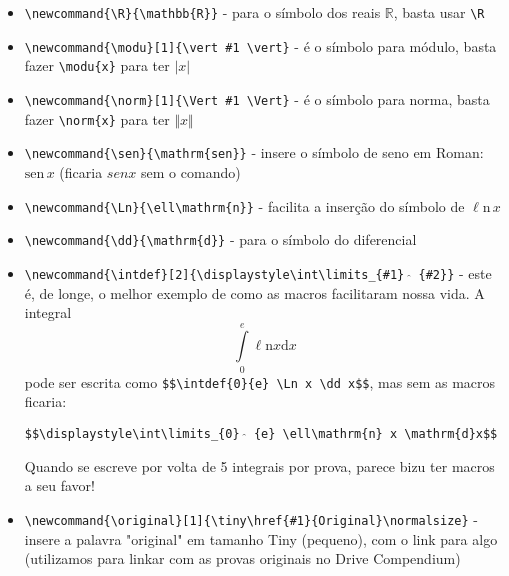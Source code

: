 \documentclass[12pt,a4paper]{article}
\newcommand{\modu}[1]{\vert #1 \vert}
\newcommand{\norm}[1]{\Vert #1 \Vert}
\newcommand{\sen}{\mathrm{sen}}
\newcommand{\dd}{\mathrm{d}}
\newcommand{\Ln}{\ell\mathrm{n}}
\newcommand{\intdef}[2]{\displaystyle\int\limits_{#1}^{#2}}
\begin{document}
\begin{itemize}
\item \texttt{\textbackslash newcommand\{\textbackslash R\}\{\textbackslash mathbb\{R\}\}} - para o símbolo dos reais $\mathbb{R}$, basta usar \texttt{\textbackslash R}

\item \texttt{\textbackslash newcommand\{\textbackslash modu\}[1]\{\textbackslash vert \#1 \textbackslash vert\}} - é o símbolo para módulo, basta fazer \texttt{\textbackslash modu\{x\}} para ter $\modu{x}$

\item \texttt{\textbackslash newcommand\{\textbackslash norm\}[1]\{\textbackslash Vert \#1 \textbackslash Vert\}} - é o símbolo para norma, basta fazer \texttt{\textbackslash norm\{x\}} para ter $\norm{x}$

\item \texttt{\textbackslash newcommand\{\textbackslash sen\}\{\textbackslash mathrm\{sen\}\}} - insere o símbolo de seno em Roman: $\sen\, x$ (ficaria $senx$ sem o comando)

\item \texttt{\textbackslash newcommand\{\textbackslash Ln\}\{\textbackslash ell\textbackslash mathrm\{n\}\}} - facilita a inserção do símbolo de $\Ln\, x$

\item \texttt{\textbackslash newcommand\{\textbackslash dd\}\{\textbackslash mathrm\{d\}\}} - para o símbolo do diferencial

\item \texttt{\textbackslash newcommand\{\textbackslash intdef\}[2]\{\textbackslash displaystyle\textbackslash int\textbackslash limits\_\{\#1\} $\widehat{}$ \{\#2\}\}} - este é, de longe, o melhor exemplo de como as macros facilitaram nossa vida. A integral $$\intdef{0}{e} \Ln x \dd x$$ pode ser escrita como \texttt{\$\$\textbackslash intdef\{0\}\{e\} \textbackslash Ln x \textbackslash dd x\$\$}, mas sem as macros ficaria:

\texttt{\$\$\textbackslash displaystyle\textbackslash int\textbackslash limits\_\{0\} $\widehat{}$ \{e\} \textbackslash ell\textbackslash mathrm\{n\} x \textbackslash mathrm\{d\}x\$\$}

Quando se escreve por volta de 5 integrais por prova, parece bizu ter macros a seu favor!


\item \texttt{\textbackslash newcommand\{\textbackslash original\}[1]\{\textbackslash tiny\textbackslash href\{\#1\}\{Original\}\textbackslash normalsize\}} - insere a palavra "original" em tamanho Tiny (pequeno), com o link para algo (utilizamos para linkar com as provas originais no Drive Compendium)


\end{itemize}
\end{document}
